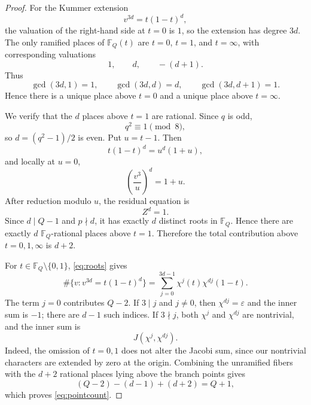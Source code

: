 \documentclass[10pt,a4paper]{amsart}
\newcommand{\F}{\mathbb{F}}
\begin{document}
\begin{proof}
For the Kummer extension
\[
v^{3d}=t(1-t)^d,
\]
the valuation of the right-hand side at $t=0$ is $1$, so the extension has degree $3d$. The only ramified places of $\F_Q(t)$ are $t=0$, $t=1$, and $t=\infty$, with corresponding valuations
\[
1,\qquad d,\qquad -(d+1).
\]
Thus
\[
\gcd(3d,1)=1,
\qquad
\gcd(3d,d)=d,
\qquad
\gcd(3d,d+1)=1.
\]
Hence there is a unique place above $t=0$ and a unique place above $t=\infty$.

We verify that the $d$ places above $t=1$ are rational. Since $q$ is odd,
\[
q^2\equiv 1\pmod 8,
\]
so $d=(q^2-1)/2$ is even. Put $u=t-1$. Then
\[
t(1-t)^d=u^d(1+u),
\]
and locally at $u=0$,
\[
\left(\frac{v^3}{u}\right)^d=1+u.
\]
After reduction modulo $u$, the residual equation is
\[
Z^d=1.
\]
Since $d\mid Q-1$ and $p\nmid d$, it has exactly $d$ distinct roots in $\F_Q$. Hence there are exactly $d$ $\F_Q$-rational places above $t=1$. Therefore the total contribution above $t=0,1,\infty$ is $d+2$.

For $t\in\F_Q\setminus\{0,1\}$, \eqref{eq:roots} gives
\[
\#\{v:v^{3d}=t(1-t)^d\}
=
\sum_{j=0}^{3d-1}\chi^j(t)\chi^{dj}(1-t).
\]
The term $j=0$ contributes $Q-2$. If $3\mid j$ and $j\ne 0$, then $\chi^{dj}=\varepsilon$ and the inner sum is $-1$; there are $d-1$ such indices. If $3\nmid j$, both $\chi^j$ and $\chi^{dj}$ are nontrivial, and the inner sum is
\[
J(\chi^j,\chi^{dj}).
\]
Indeed, the omission of $t=0,1$ does not alter the Jacobi sum, since our nontrivial characters are extended by zero at the origin. Combining the unramified fibers with the $d+2$ rational places lying above the branch points gives
\[
(Q-2)-(d-1)+(d+2)=Q+1,
\]
which proves \eqref{eq:pointcount}.
\end{proof}
\end{document}

